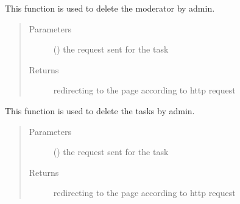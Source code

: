 \documentclass[letterpaper,10pt,english]{sphinxmanual}
\begin{document}
\begin{fulllineitems}
\label{\detokenize{janta:janta.views.admin_del_moderator}}
This function is used to delete the moderator by admin.
\begin{quote}\begin{description}
\item[{Parameters}] \leavevmode
{} () \textendash{} the request sent for the task

\item[{Returns}] \leavevmode
redirecting to the page according to http request

\end{description}\end{quote}

\end{fulllineitems}


\begin{fulllineitems}
\label{\detokenize{janta:janta.views.admin_del_task}}
This function is used to delete the tasks by admin.
\begin{quote}\begin{description}
\item[{Parameters}] \leavevmode
{} () \textendash{} the request sent for the task

\item[{Returns}] \leavevmode
redirecting to the page according to http request

\end{description}\end{quote}

\end{fulllineitems}

\end{document}
